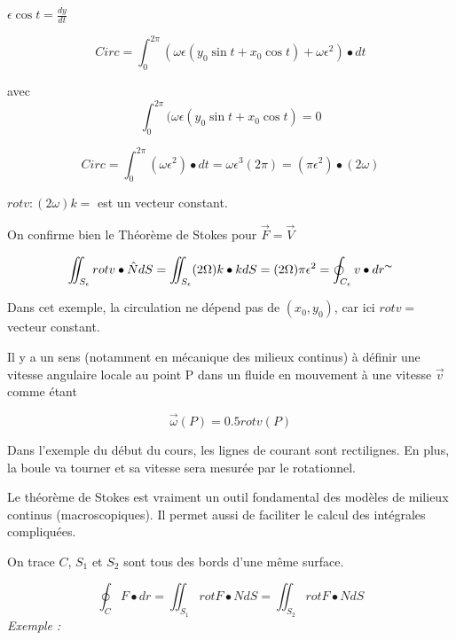 $\epsilon \cos t =\frac{dy}{dt}$




\[Circ = \int_0^{2\pi} (\omega \epsilon ( y_0 \sin t + x_0 \cos t ) + \omega \epsilon ^2 )\bullet dt \]

avec \[ \int_0^{2\pi} (\omega \epsilon ( y_0 \sin t + x_0 \cos t )  = 0\]


\[Circ = \int_0^{2\pi} ( \omega \epsilon ^2 )\bullet dt = \omega \epsilon^3 ( 2 \pi ) = (\pi \epsilon^2 )\bullet ( 2 \omega ) \]

\begin{myrem}
$rot v : ( 2 \omega ) k = $ est un vecteur constant.

On confirme bien le Théorème de Stokes pour $\vec F = \vec V $


\[\iint_{S_{\epsilon}} rot v \bullet \hat N dS = \iint_{S_{\epsilon}} (2\Omega) k\bullet k dS = (2 \Omega ) \pi \epsilon ^2 = \oint_{C_{\epsilon}} v\bullet dr^{\thicksim} \]

\end{myrem}

\begin{myrem}


Dans cet exemple, la circulation ne dépend pas de $(x_0,y_0)$, car ici $ rot v = $ vecteur constant.
\end{myrem}

\begin{myrem}

Il y a un sens (notamment en mécanique des milieux continus) à définir une vitesse angulaire locale au point P dans un fluide en mouvement à une vitesse $\vec v$ comme étant

$$\vec \omega (P) = 0.5 rot v (P) $$

\end{myrem}

\begin{myrem}
Dans l'exemple du début du cours, les lignes de courant sont rectilignes. En plus, la boule va tourner et sa vitesse sera mesurée par le rotationnel.
\end{myrem}


Le théorème de Stokes est vraiment un outil fondamental des modèles de milieux continus (macroscopiques). Il permet aussi de faciliter le calcul des intégrales compliquées.

On trace $C$, $S_1$ et $S_2$ sont tous des bords d'une même surface.

\[\oint_C F \bullet dr = \iint_{S_1}rot F \bullet N dS = \iint_{S_2}rot F \bullet N dS\]
\textit{
Exemple : }

